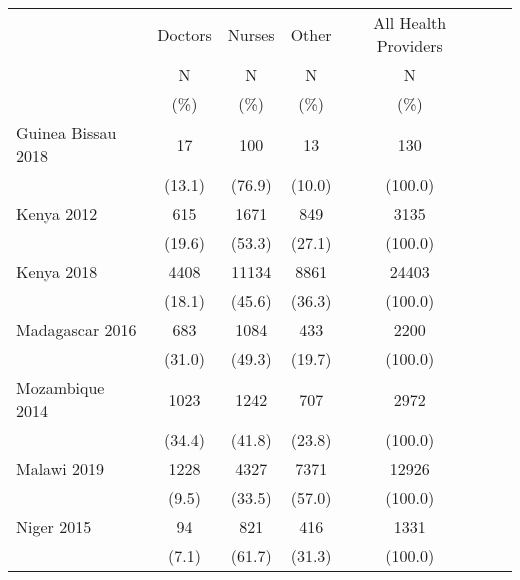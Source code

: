 \def\sym#1{\ifmmode^{#1}\else\(^{#1}\)\fi}
\begin{tabular}{l*{6}{c}}
\hline\hline
         &\multicolumn{1}{c}{Doctors}&\multicolumn{1}{c}{Nurses}&\multicolumn{1}{c}{Other}&\multicolumn{1}{c}{All Health Providers}&\\
         &                                     N&              N&                      N&           N\\
         &                                     (\%)&           (\%)&                   (\%)&       (\%)\\
\hline
Guinea Bissau 2018&            {17}&                {100}&           {13}&             {130}\\
&                                              {(13.1)}&      {(76.9)}&             {(10.0)}&           {(100.0)}\\
Kenya 2012&                            {615}&                {1671}&           {849}&             {3135}\\
&                                              {(19.6)}&      {(53.3)}&             {(27.1)}&           {(100.0)}\\
Kenya 2018&                    {4408}&                {11134}&           {8861}&             {24403}\\
&                                              {(18.1)}&      {(45.6)}&             {(36.3)}&           {(100.0)}\\
Madagascar 2016&               {683}&                {1084}&           {433}&             {2200}\\
&                                              {(31.0)}&      {(49.3)}&             {(19.7)}&           {(100.0)}\\
Mozambique 2014&               {1023}&                {1242}&           {707}&             {2972}\\
&                                              {(34.4)}&      {(41.8)}&             {(23.8)}&           {(100.0)}\\
Malawi 2019&                   {1228}&                {4327}&           {7371}&             {12926}\\
&                                              {(9.5)}&      {(33.5)}&             {(57.0)}&           {(100.0)}\\
Niger 2015&                    {94}&                {821}&           {416}&             {1331}\\
&                                              {(7.1)}&      {(61.7)}&             {(31.3)}&           {(100.0)}\\

\end{tabular}

